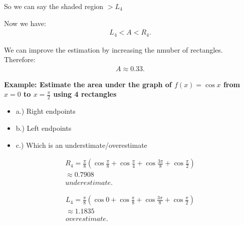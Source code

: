 \documentclass{report}
\begin{document}
\bigbreak \noindent 
So we can say the shaded region $> L_{4} $

\bigbreak \noindent 
Now we have:
\begin{align*}
  L_{4} < A < R_{4}
.\end{align*}

\bigbreak \noindent 
We can improve the estimation by increasing the nmuber of rectangles. Therefore: 
\begin{align*}
  A \approx 0.33
.\end{align*}

\pagebreak \bigbreak \noindent
\begin{mdframed}
  \textbf{Example: Estimate the area under the graph of $f(x) = \cos{x}$ from $ x=0 $ to $x = \frac{\pi }{2} $ using 4 rectangles}
  \begin{itemize}
    \item a.) Right endpoints
    \item b.) Left endpoints
    \item c.) Which is an understimate/overestimate
  \end{itemize}
\end{mdframed}

\bigbreak \noindent 
\begin{figure}[ht]
    \centering
    \label{fig:graph1}
\end{figure}

\begin{align*}
  R_{4} = \frac{\pi}{8}(\cos{\frac{\pi }{8}} + \cos{\frac{\pi}{4}} + \cos{\frac{3\pi}{8}} + \cos{\frac{\pi}{2}}) \\
  \approx 0.7908  \\
  \boxed{underestimate}
.\end{align*}

\bigbreak \noindent 
\begin{figure}[ht]
    \centering
    \label{fig:grahp2}
\end{figure}

\begin{align*}
  L_{4} = \frac{\pi}{8}(\cos{0} + \cos{\frac{\pi }{8}} + \cos{\frac{3\pi }{8}} + \cos{\frac{\pi }{2}})   \\
  \approx 1.1835 \\
  \boxed{overestimate}
.\end{align*}
\end{document}

